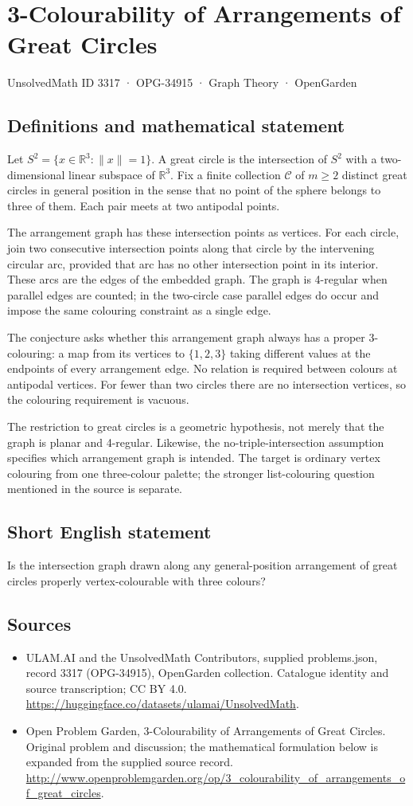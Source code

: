 \documentclass[11pt,a4paper]{article}
\begin{document}
\section*{3-Colourability of Arrangements of Great Circles}\label{3317}
{\small UnsolvedMath ID 3317 · OPG-34915 · Graph Theory · OpenGarden}
\subsection{Definitions and mathematical statement}
Let $S^2=\{x\in\mathbb R^3:\|x\|=1\}$. A great circle is the
intersection of $S^2$ with a two-dimensional linear subspace of
$\mathbb R^3$. Fix a finite collection $\mathcal C$ of $m\ge2$
distinct great circles in general position in the sense that no
point of the sphere belongs to three of them. Each pair meets at
two antipodal points.

The arrangement graph has these intersection points as vertices.
For each circle, join two consecutive intersection points along
that circle by the intervening circular arc, provided that arc has
no other intersection point in its interior. These arcs are the
edges of the embedded graph. The graph is 4-regular when parallel
edges are counted; in the two-circle case parallel edges do occur
and impose the same colouring constraint as a single edge.

The conjecture asks whether this arrangement graph always has a
proper 3-colouring: a map from its vertices to $\{1,2,3\}$ taking
different values at the endpoints of every arrangement edge.
No relation is required between colours at antipodal vertices.
For fewer than two circles there are no intersection vertices,
so the colouring requirement is vacuous.

The restriction to great circles is a geometric hypothesis, not
merely that the graph is planar and 4-regular. Likewise, the
no-triple-intersection assumption specifies which arrangement graph
is intended. The target is ordinary vertex colouring from one
three-colour palette; the stronger list-colouring question mentioned
in the source is separate.
\subsection{Short English statement}
Is the intersection graph drawn along any general-position arrangement of great circles properly vertex-colourable with three colours?
\subsection{Sources}
\begin{itemize}
\item[S1] ULAM.AI and the UnsolvedMath Contributors, supplied problems.json, record 3317 (OPG-34915), OpenGarden collection. Catalogue identity and source transcription; CC BY 4.0.
\url{https://huggingface.co/datasets/ulamai/UnsolvedMath}.
\item[S2] Open Problem Garden, 3-Colourability of Arrangements of Great Circles. Original problem and discussion; the mathematical formulation below is expanded from the supplied source record.
\url{http://www.openproblemgarden.org/op/3_colourability_of_arrangements_of_great_circles}.
\end{itemize}
\end{document}
